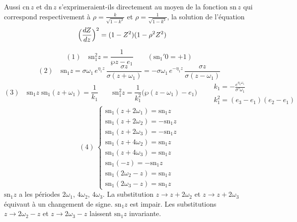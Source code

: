 \documentclass[11pt,a4paper]{article}
\begin{document}
Aussi $\mathrm{cn}\,z$ et $\mathrm{dn}\,z$ s'exprimeraient-ils directement au moyen
de la fonction $\mathrm{sn}\,z$ qui correspond respectivement à
$\rho = \frac{k}{\sqrt{1-k^2}}$ et $\rho = \frac{1}{\sqrt{1-k^2}}$, la solution de
l'équation
\[
\Bigl(\frac{dZ}{dz}\Bigr)^2 = (1-Z^2)(1-\rho^2 Z^2) \qquad
\]

\[
(1)\quad \mathrm{sn}_1^2 z = \frac{1}{\wp z - e_1} \qquad (\mathrm{sn}_1'0 = +1)
\]
\[
(2)\quad \mathrm{sn}_1 z = \sigma\omega_1\,e^{\eta_1 z}\,\frac{\sigma z}{\sigma(z+\omega_1)}
= -\sigma\omega_1\,e^{-\eta_1 z}\,\frac{\sigma z}{\sigma(z-\omega_1)}
\]
\[
(3)\quad \mathrm{sn}_1 z\;\mathrm{sn}_1(z+\omega_1) = \frac{1}{k_1} \qquad
\mathrm{sn}_1^2 z = \frac{1}{k_1^2}\bigl(\wp(z-\omega_1) - e_1\bigr) \qquad
\begin{array}{l}
k_1 = -\frac{e^{\eta_1\omega_1}}{\sigma'\omega_1}\\[2pt]
k_1^2 = (e_3-e_1)(e_2-e_1)
\end{array}
\]
\[
(4)\ \left\lbrace
\begin{array}{l}
\mathrm{sn}_1(z+2\omega_1) = \mathrm{sn}_1 z\\
\mathrm{sn}_1(z+2\omega_2) = -\mathrm{sn}_1 z\\
\mathrm{sn}_1(z+2\omega_3) = -\mathrm{sn}_1 z\\[4pt]
\mathrm{sn}_1(z+4\omega_2) = \mathrm{sn}_1 z\\
\mathrm{sn}_1(z+4\omega_3) = \mathrm{sn}_1 z\\[4pt]
\mathrm{sn}_1(-z) = -\mathrm{sn}_1 z\\[4pt]
\mathrm{sn}_1(2\omega_2 - z) = \mathrm{sn}_1 z\\
\mathrm{sn}_1(2\omega_3 - z) = \mathrm{sn}_1 z
\end{array}
\right.
\]
$\mathrm{sn}_1 z$ a les périodes $2\omega_1$, $4\omega_2$, $4\omega_3$. La
substitution $z\to z+2\omega_2$ et $z\to z+2\omega_3$ équivaut à un changement de
signe. $\mathrm{sn}_1 z$ est impair. Les substitutions $z\to 2\omega_2 - z$ et
$z\to 2\omega_3 - z$ laissent $\mathrm{sn}_1 z$ invariante.
\end{document}
